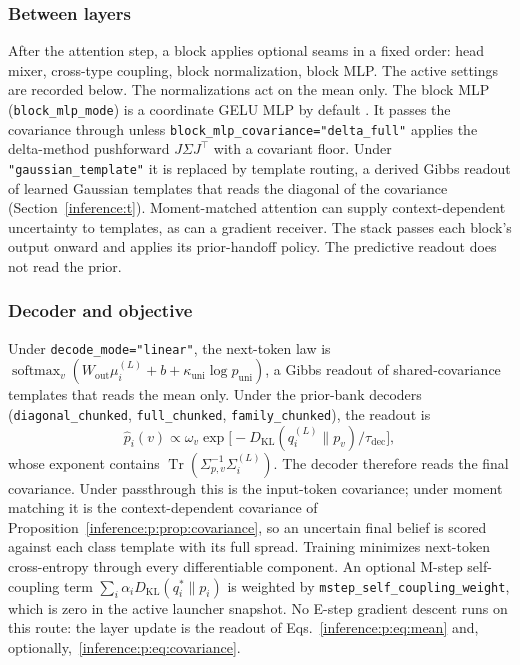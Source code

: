\documentclass[11pt]{article}
\theoremstyle{definition}
\theoremstyle{remark}
\providecommand{\cfg}[1]{{\small\texttt{#1}}}
\providecommand{\KL}{D_{\mathrm{KL}}}
\providecommand{\softmax}{\operatorname{softmax}}
\providecommand{\Tr}{\operatorname{Tr}}
\begin{document}
\subsubsection{Between layers}
\label{inference:p:sec:block}

After the attention step, a block applies optional seams in a fixed order: head mixer, cross-type coupling, block normalization, block MLP. The active settings are recorded below. The normalizations act on the mean only. The block MLP (\cfg{block\_mlp\_mode}) is a coordinate GELU MLP by default \citep{links:hendrycks2016gelu}. It passes the covariance through unless \cfg{block\_mlp\_covariance="delta\_full"} applies the delta-method pushforward $J\Sigma J^{\top}$ with a covariant floor. Under \cfg{"gaussian\_template"} it is replaced by template routing, a derived Gibbs readout of learned Gaussian templates that reads the diagonal of the covariance (Section~\ref{inference:t}). Moment-matched attention can supply context-dependent uncertainty to templates, as can a gradient receiver. The stack passes each block's output onward and applies its prior-handoff policy. The predictive readout does not read the prior.

\subsubsection{Decoder and objective}
\label{inference:p:sec:decode}

Under \cfg{decode\_mode="linear"}, the next-token law is $\softmax_v(W_{\mathrm{out}}\mu_i^{(L)}+b+\kappa_{\mathrm{uni}}\log p_{\mathrm{uni}})$, a Gibbs readout of shared-covariance templates that reads the mean only. Under the prior-bank decoders (\cfg{diagonal\_chunked}, \cfg{full\_chunked}, \cfg{family\_chunked}), the readout is
\begin{equation}
\hat p_i(v)\propto\omega_v\exp\bigl[-\KL(q_i^{(L)}\|p_v)/\tau_{\mathrm{dec}}\bigr],
\label{inference:p:eq:decode}
\end{equation}
whose exponent contains $\Tr(\Sigma_{p,v}^{-1}\Sigma_i^{(L)})$. The decoder therefore reads the final covariance. Under passthrough this is the input-token covariance; under moment matching it is the context-dependent covariance of Proposition~\ref{inference:p:prop:covariance}, so an uncertain final belief is scored against each class template with its full spread. Training minimizes next-token cross-entropy through every differentiable component. An optional M-step self-coupling term $\sum_i\alpha_i\KL(q_i^{*}\|p_i)$ is weighted by \cfg{mstep\_self\_coupling\_weight}, which is zero in the active launcher snapshot. No E-step gradient descent runs on this route: the layer update is the readout of Eqs.~\eqref{inference:p:eq:mean} and, optionally,~\eqref{inference:p:eq:covariance}.
\end{document}
